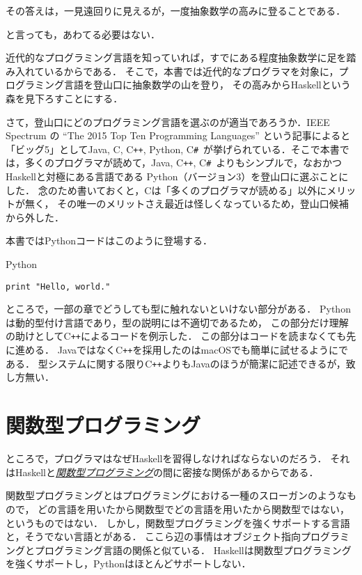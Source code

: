\documentclass[a5paper,draft]{jsbook}
\newcommand{\programminglanguage}[1]{\textsf{#1}}
\newcommand{\clang}{\programminglanguage{C}}
\newcommand{\csharp}{\programminglanguage{C}\texttt{\#}}
\newcommand{\cxx}{\programminglanguage{C}\texttt{++}}
\newcommand{\haskell}{\programminglanguage{Haskell}}
\newcommand{\java}{\programminglanguage{Java}}
\newcommand{\python}{\programminglanguage{Python}}
\newcommand{\keyword}[1]{{\underline{\emph{#1}}}}
\newenvironment{pythoncode}{\begin{itembox}[r]{\python}}{\end{itembox}}
\begin{document}
その答えは，一見遠回りに見えるが，一度抽象数学の高みに登ることである．

と言っても，あわてる必要はない．

近代的なプログラミング言語を知っていれば，すでにある程度抽象数学に足を踏み入れているからである．
そこで，本書では近代的なプログラマを対象に，プログラミング言語を登山口に抽象数学の山を登り，
その高みから\haskell という森を見下ろすことにする．

さて，登山口にどのプログラミング言語を選ぶのが適当であろうか．IEEE Spectrum の ``The 2015
Top Ten Programming Languages'' という記事によると「ビッグ5」として\java, \clang,
\cxx, \python, \csharp\ が挙げられている．そこで本書では，多くのプログラマが読めて，\java,
\cxx, \csharp\ よりもシンプルで，なおかつ\haskell と対極にある言語である
\python（バージョン3）を登山口に選ぶことにした．
念のため書いておくと，\clang は「多くのプログラマが読める」以外にメリットが無く，
その唯一のメリットさえ最近は怪しくなっているため，登山口候補から外した．

本書では\python コードはこのように登場する．
\begin{pythoncode}
\begin{verbatim}
print "Hello, world."
\end{verbatim}
\end{pythoncode}

ところで，一部の章でどうしても型に触れないといけない部分がある．
\python は動的型付け言語であり，型の説明には不適切であるため，
この部分だけ理解の助けとして\cxx によるコードを例示した．
この部分はコードを読まなくても先に進める．
\java ではなく\cxx を採用したのはmacOSでも簡単に試せるようにである．
型システムに関する限り\cxx よりも\java のほうが簡潔に記述できるが，致し方無い．

\section{関数型プログラミング}

ところで，プログラマはなぜ\haskell を習得しなければならないのだろう．
それは\haskell と\keyword{関数型プログラミング}の間に密接な関係があるからである．

関数型プログラミングとはプログラミングにおける一種のスローガンのようなもので，
どの言語を用いたから関数型でどの言語を用いたから関数型ではない，というものではない．
しかし，関数型プログラミングを強くサポートする言語と，そうでない言語とがある．
ここら辺の事情はオブジェクト指向プログラミングとプログラミング言語の関係と似ている．
\haskell は関数型プログラミングを強くサポートし，\python はほとんどサポートしない．
\end{document}
